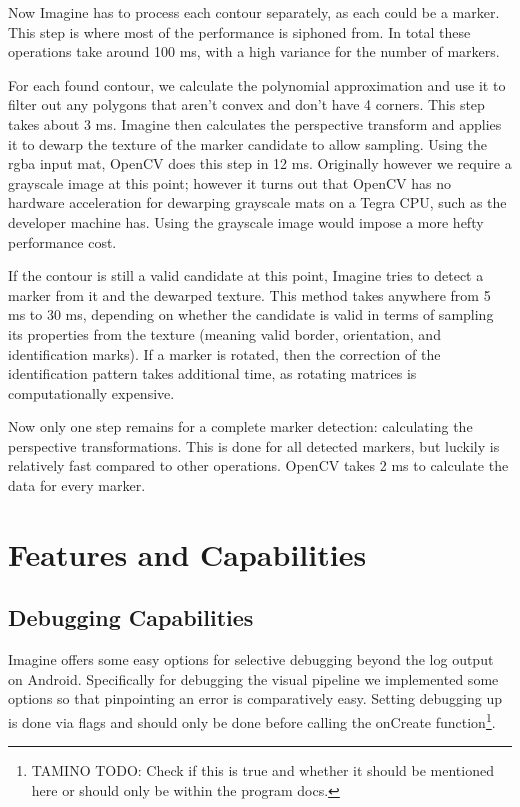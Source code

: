 Now Imagine has to process each contour separately, as each could be a marker.
This step is where most of the performance is siphoned from.
In total these operations take around 100 ms, with a high variance for the number of markers.

For each found contour, we calculate the polynomial approximation and use it to filter out any polygons that aren't convex and don't have 4 corners.
This step takes about 3 ms.
Imagine then calculates the perspective transform and applies it to dewarp the texture of the marker candidate to allow sampling.
Using the rgba input mat, OpenCV does this step in 12 ms.
Originally however we require a grayscale image at this point; however it turns out that OpenCV has no hardware acceleration for dewarping grayscale mats on a Tegra CPU, such as the developer machine has.
Using the grayscale image would impose a more hefty performance cost.

If the contour is still a valid candidate at this point, Imagine tries to detect a marker from it and the dewarped texture.
This method takes anywhere from 5 ms to 30 ms, depending on whether the candidate is valid in terms of sampling its properties from the texture (meaning valid border, orientation, and identification marks).
If a marker is rotated, then the correction of the identification pattern takes additional time, as rotating matrices is computationally expensive.

Now only one step remains for a complete marker detection: calculating the perspective transformations.
This is done for all detected markers, but luckily is relatively fast compared to other operations.
OpenCV takes 2 ms to calculate the data for every marker.

\section{Features and Capabilities}

\subsection{Debugging Capabilities}

Imagine offers some easy options for selective debugging beyond the log output on Android.
Specifically for debugging the visual pipeline we implemented some options so that pinpointing an error is comparatively easy.
Setting debugging up is done via flags and should only be done before calling the onCreate function\footnote{TAMINO TODO: Check if this is true and whether it should be mentioned here or should only be within the program docs.}.

